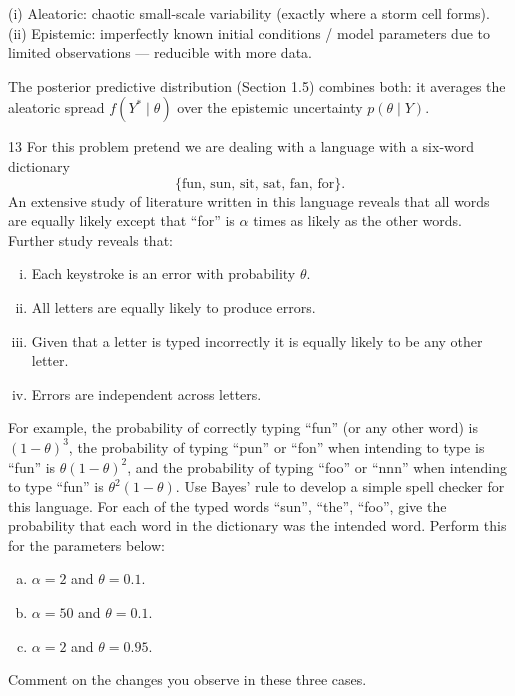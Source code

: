 \documentclass[11pt]{article}
\begin{document}
\begin{answer}
(i) Aleatoric: chaotic small-scale variability (exactly where a storm cell forms). (ii) Epistemic: imperfectly known initial conditions / model parameters due to limited observations --- reducible with more data.
\end{answer}

\begin{takeaway}
The posterior predictive distribution (Section 1.5) combines both: it averages the aleatoric spread $f(Y^*\mid\theta)$ over the epistemic uncertainty $p(\theta\mid Y)$.
\end{takeaway}


\begin{problem}{13}
For this problem pretend we are dealing with a language with a six-word dictionary
\[
\{\text{fun, sun, sit, sat, fan, for}\}.
\]
An extensive study of literature written in this language reveals that all words are equally likely except that ``for'' is $\alpha$ times as likely as the other words. Further study reveals that:
\begin{enumerate}[i.]
\item Each keystroke is an error with probability $\theta$.
\item All letters are equally likely to produce errors.
\item Given that a letter is typed incorrectly it is equally likely to be any other letter.
\item Errors are independent across letters.
\end{enumerate}
For example, the probability of correctly typing ``fun'' (or any other word) is $(1-\theta)^3$, the probability of typing ``pun'' or ``fon'' when intending to type is ``fun'' is $\theta(1-\theta)^2$, and the probability of typing ``foo'' or ``nnn'' when intending to type ``fun'' is $\theta^2(1-\theta)$. Use Bayes' rule to develop a simple spell checker for this language. For each of the typed words ``sun'', ``the'', ``foo'', give the probability that each word in the dictionary was the intended word. Perform this for the parameters below:
\begin{enumerate}[(a)]
\item $\alpha=2$ and $\theta=0.1$.
\item $\alpha=50$ and $\theta=0.1$.
\item $\alpha=2$ and $\theta=0.95$.
\end{enumerate}
Comment on the changes you observe in these three cases.
\end{problem}
\end{document}

